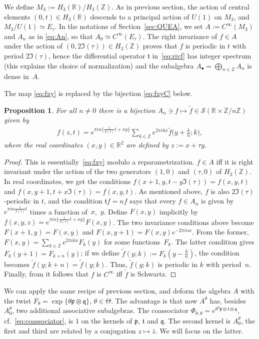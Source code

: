 \documentclass[pdftex]{sigma}
\numberwithin{equation}{section}
\newtheorem{prop}[thm]{Proposition}
\theoremstyle{definition}
\newcommand{\R}{\mathbb{R}}
\newcommand{\Z}{\mathbb{Z}}
\newcommand{\mc}{\mathcal}
\newcommand{\mf}{\mathfrak}
\newcommand{\ga}{\mf{p}}
\newcommand{\gb}{\mf{q}}
\newcommand{\gc}{\mf{t}}
\begin{document}
We def\/ine $M_3:=H_3(\R)/H_3(\Z)$.
As in previous section,
the action of central elements $(0,t)\in H_3(\R)$ descends to a principal action of $U(1)$ on $M_3$, and $M_3/U(1)\simeq E_\tau$.
In the notations of Section~\ref{sec:QUEA}, we set
$A:=C^\infty(M_3)$ and $A_n$ as in \eqref{eq:An}, so that
$A_0\simeq C^\infty(E_\tau)$.
The right invariance of $f\in A$ under the action of $(0,2\Im(\tau))\in H_3(\Z)$ proves that $f$ is periodic in $t$ with period $2\Im(\tau)$, hence
the dif\/ferential operator $\gc$ in~\eqref{eq:rivf} has integer spectrum (this explains the choice of normalization) and the subalgebra $A_\bullet=\bigoplus_{n\in\Z}A_n$
is dense in~$A$.

The map \eqref{eq:fxy} is replaced by the bijection \eqref{eq:fxyC} below.

\begin{prop}
For all $n\neq 0$ there is a bijection $A_n\ni f\mapsto\widetilde{f}\in\mc{S}(\R\times\Z/n\Z)$ given by
\begin{gather}\label{eq:fxyC}
f(z,t)=e^{\pi in\{\frac{1}{\Im(\tau)}t+xy\}}
\sum_{k\in\Z}e^{2\pi ikx}\widetilde{f}\big(y+\tfrac{k}{n};k\big),
\end{gather}
where the real coordinates $(x,y)\in\R^2$ are defined by $z:=x+\tau y$.
\end{prop}
\begin{proof}
This is essentially~\eqref{eq:fxy} modulo a reparametrization.
$f\in A$ if\/f it is right invariant under the action of the two
generators $(1,0)$ and $(\tau,0)$ of $H_3(\Z)$. In real coordinates,
we get the conditions
$f(x+1,y,t-y\Im(\tau))=f(x,y,t)$
and
$f(x,y+1,t+x\Im(\tau))=f(x,y,t)$.
As mentioned above, $f$ is also $2\Im(\tau)$-periodic in $t$, and
the condition $\gc f=nf$ says that every $f\in A_n$ is given by
$e^{\pi in\frac{1}{\Im(\tau)}t}$ times a function of~$x$,~$y$.
Def\/ine $F(x,y)$ implicitly by $f(x,y,z)=e^{\pi in\{\frac{1}{\Im(\tau)}t+xy\}}F(x,y)$.
The two invariance conditions above become $F(x+1,y)=F(x,y)$ and
$F(x,y+1)=F(x,y)e^{-2\pi inx}$. From the former, $F(x,y)=\sum\limits_{k\in\Z}e^{2\pi ikx}F_k(y)$ for some functions~$F_k$. The latter condition gives
$F_k(y+1)=F_{k+n}(y)$; if we def\/ine $\widetilde{f}(y;k):=F_k(y-\frac{k}{n})$,
the condition becomes $\widetilde{f}(y;k+n)=\widetilde{f}(y;k)$. Thus,
$\widetilde{f}(y;k)$ is periodic in $k$ with period~$n$.
Finally, from \cite[Lemma~3.2]{DFF13} it follows that $f$ is $C^\infty$
if\/f $\widetilde{f}$ is Schwartz.
\end{proof}

We can apply the same recipe of previous section, and deform the algebra $A$ with the twist $F_\theta=\exp\big\{\theta \ga \otimes\gb\big\}$, $\theta\in\Theta$.
The advantage is that now $A^\theta$ has, besides $A^\theta_0$, two additional associative subalgebras.
The coassociator
$\Phi_{\theta,\theta}=e^{\theta^2\ga \otimes \gc \otimes \gb}$, cf.~\eqref{eq:coassociator},
is $1$ on the kernels of $\ga$, $\gc$ and $\gb$. The second kernel is $A_0^\theta$, the f\/irst and third are related by a conjugation $z\mapsto\bar z$. We will focus on the latter.
\end{document}
